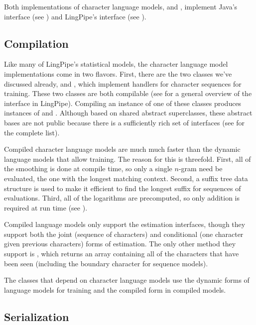 Both implementations of character language models,
 and , implement Java's
 interface (see ) and
LingPipe's  interface (see ).

\subsection{Compilation}

Like many of LingPipe's statistical models, the character language
model implementations come in two flavors.  First, there are the two
classes we've discussed already,  and
, which implement handlers for character
sequences for training.  These two classes are both compilable (see
 for a general overview of the 
interface in LingPipe).  Compiling an instance of one of these classes
produces instances of  and
.  Although based on shared abstract
superclasses, these abstract bases are not public because there is a
sufficiently rich set of interfaces (see 
for the complete list).

Compiled character language models are much much faster than the
dynamic language models that allow training.  The reason for this is
threefold.  First, all of the smoothing is done at compile time, so
only a single $n$-gram need be evaluated, the one with the longest
matching context.  Second, a suffix tree data structure is used to
make it efficient to find the longest suffix for sequences of
evaluations.  Third, all of the logarithms are precomputed, so only
addition is required at run time (see ).  

Compiled language models only support the estimation interfaces,
though they support both the joint (sequence of characters) and
conditional (one character given previous characters) forms of
estimation.  The only other method they support is
, which returns an array containing all of
the characters that have been seen (including the boundary character
for sequence models).

The classes that depend on character language models use the dynamic
forms of language models for training and the compiled form in compiled
models.

\subsection{Serialization}

